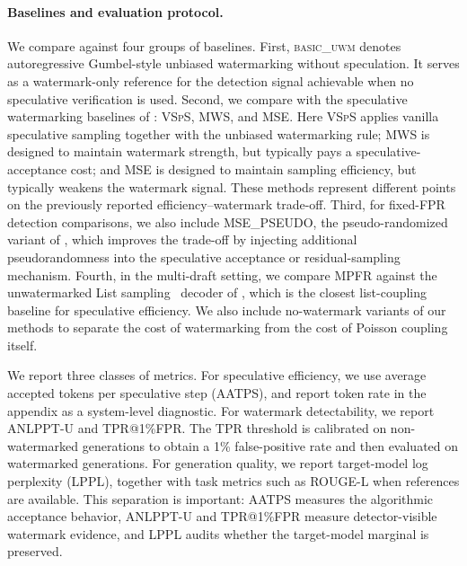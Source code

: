 \documentclass{article}
\theoremstyle{plain}
\theoremstyle{definition}
\begin{document}
\paragraph{Baselines and evaluation protocol.}
We compare against four groups of baselines. First, \textsc{basic\_uwm} denotes
autoregressive Gumbel-style unbiased watermarking without speculation. It serves as
a watermark-only reference for the detection signal achievable when no speculative
verification is used. Second, we compare with the speculative watermarking baselines
of \citet{hu2024inevitable}: \textsc{VSpS}, \textsc{MWS}, and \textsc{MSE}.
Here \textsc{VSpS} applies vanilla speculative sampling together with the unbiased
watermarking rule; \textsc{MWS} is designed to maintain watermark strength, but
typically pays a speculative-acceptance cost; and \textsc{MSE} is designed to
maintain sampling efficiency, but typically weakens the watermark signal. These
methods represent different points on the previously reported
efficiency--watermark trade-off. Third, for fixed-FPR detection comparisons, we also
include \textsc{MSE\_PSEUDO}, the pseudo-randomized variant of
\citet{he2026improving}, which improves the trade-off by injecting additional
pseudorandomness into the speculative acceptance or residual-sampling mechanism.
Fourth, in the multi-draft setting, we compare \textsc{MPFR} against the
unwatermarked List sampling~\citep{rowan2025list} decoder of \citet{rowan2025list}, which is the
closest list-coupling baseline for speculative efficiency. We also include
no-watermark variants of our methods to separate the cost of watermarking from the
cost of Poisson coupling itself.

We report three classes of metrics. For speculative efficiency, we use average
accepted tokens per speculative step (AATPS), and report token rate in the appendix
as a system-level diagnostic. For watermark detectability, we report ANLPPT-U and
TPR@1\%FPR. The TPR threshold is calibrated on non-watermarked generations to obtain
a 1\% false-positive rate and then evaluated on watermarked generations. For
generation quality, we report target-model log perplexity (LPPL), together with
task metrics such as ROUGE-L when references are available. This separation is
important: AATPS measures the algorithmic acceptance behavior, ANLPPT-U and
TPR@1\%FPR measure detector-visible watermark evidence, and LPPL audits whether the
target-model marginal is preserved.
\end{document}
